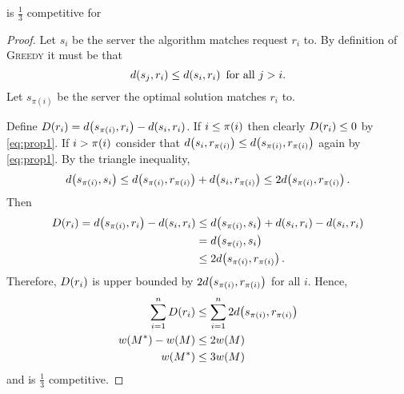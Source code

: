 \begin{theorem}
    \greedy{} is $\frac{1}{3}$ competitive for \momwm{}
    \label{thm:greedy_momwm}
\end{theorem}
\begin{proof}
    Let $s_i$ be the server the algorithm matches request $r_i$ to. By definition of \textsc{Greedy} it must be that 
    \begin{equation}
        \f[d]{s_j, r_i} \leq \f[d]{s_i, r_i} \text{ for all } j > i. 
        \label{eq:prop1}
    \end{equation}
    Let $s_{\pi(i)}$ be the server the optimal solution matches 
    $r_i$ to. 
    
    Define $\f[D]{r_i} = \f[d]{s_{\pi (i)}, r_i} - \f[d]{s_i, r_i}$. 
    If $i \leq \f[\pi]{i}$ then clearly $\f[D]{r_i} \leq 0$ by \cref{eq:prop1}. If $i > \f[\pi]{i}$ consider that 
    $\f[d]{s_i, r_{\pi (i)}} \leq \f[d]{s_{\pi (i)}, r_{\pi (i)}}$ again by \cref{eq:prop1}. By the triangle inequality, 
    \begin{equation}
        \f[d]{s_{\pi (i)}, s_i} \leq \f[d]{s_{\pi (i)}, r_{\pi (i)}} + \f[d]{s_i, r_{\pi (i)}} \leq 2 \f[d]{s_{\pi (i)}, r_{\pi (i)}}. 
        \label{eq:prop2}
    \end{equation}
    Then 
    \begin{align*}
        \f[D]{r_i} = \f[d]{s_{\pi (i)}, r_i} - \f[d]{s_i, r_i} &\leq \f[d]{s_{\pi (i)}, s_i} + \f[d]{s_i, r_i} - \f[d]{s_i, r_i}\\
        &= \f[d]{s_{\pi (i)}, s_i}\\
        &\leq 2\f[d]{s_{\pi (i)}, r_{\pi (i)}}. 
    \end{align*}
    Therefore, $\f[D]{r_i}$ is upper bounded by $2\f[d]{s_{\pi (i)}, r_{\pi (i)}}$ for all $i$. Hence, 
    \begin{align*}
        \sum_{i=1}^{n} \f[D]{r_i} &\leq \sum_{i=1}^{n} 2 \f[d]{s_{\pi (i)}, r_{\pi (i)}}\\
        \f[w]{M^*} - \f[w]{M} &\leq 2\f[w]{M}\\
        \f[w]{M^*} &\leq 3\f[w]{M}
    \end{align*}
    and \greedy{} is $\frac{1}{3}$ competitive. 
\end{proof}
